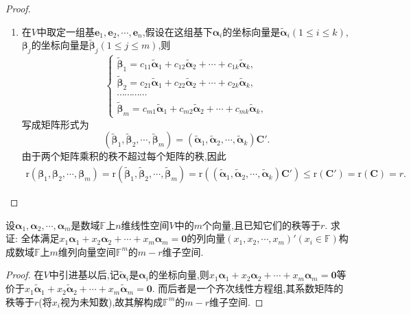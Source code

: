 \documentclass[../../main.tex]{subfiles}
\begin{document}
\begin{proof}
\begin{enumerate}[(1)]
\item 在\(V\)中取定一组基\(\boldsymbol{e}_1,\boldsymbol{e}_2,\cdots,\boldsymbol{e}_n\),假设在这组基下\(\boldsymbol{\alpha}_i\)的坐标向量是\(\widetilde{\boldsymbol{\alpha}}_i(1\leq i\leq k)\),\(\boldsymbol{\beta}_j\)的坐标向量是\(\widetilde{\boldsymbol{\beta}}_j(1\leq j\leq m)\),则
\[
\begin{cases}
\widetilde{\boldsymbol{\beta}}_1 = c_{11}\widetilde{\boldsymbol{\alpha}}_1 + c_{12}\widetilde{\boldsymbol{\alpha}}_2+\cdots + c_{1k}\widetilde{\boldsymbol{\alpha}}_k,\\
\widetilde{\boldsymbol{\beta}}_2 = c_{21}\widetilde{\boldsymbol{\alpha}}_1 + c_{22}\widetilde{\boldsymbol{\alpha}}_2+\cdots + c_{2k}\widetilde{\boldsymbol{\alpha}}_k,\\
\cdots\cdots\cdots\cdots\\
\widetilde{\boldsymbol{\beta}}_m = c_{m1}\widetilde{\boldsymbol{\alpha}}_1 + c_{m2}\widetilde{\boldsymbol{\alpha}}_2+\cdots + c_{mk}\widetilde{\boldsymbol{\alpha}}_k,
\end{cases}
\]
写成矩阵形式为
\[
(\widetilde{\boldsymbol{\beta}}_1,\widetilde{\boldsymbol{\beta}}_2,\cdots,\widetilde{\boldsymbol{\beta}}_m)=(\widetilde{\boldsymbol{\alpha}}_1,\widetilde{\boldsymbol{\alpha}}_2,\cdots,\widetilde{\boldsymbol{\alpha}}_k)\boldsymbol{C}'.
\]
由于两个矩阵乘积的秩不超过每个矩阵的秩,因此
\begin{align*}
\mathrm{r}\left( \boldsymbol{\beta }_1,\boldsymbol{\beta }_2,\cdots ,\boldsymbol{\beta }_m \right) =\mathrm{r}\left( \widetilde{\boldsymbol{\beta }}_1,\widetilde{\boldsymbol{\beta }}_2,\cdots ,\widetilde{\boldsymbol{\beta }}_m \right) =\mathrm{r}\left( \left( \widetilde{\boldsymbol{\alpha }}_1,\widetilde{\boldsymbol{\alpha }}_2,\cdots ,\widetilde{\boldsymbol{\alpha }}_k \right) \boldsymbol{C}' \right) \leqslant \mathrm{r}\left( \boldsymbol{C}'\right) =\mathrm{r}\left( \boldsymbol{C} \right) =r.
\end{align*}
\end{enumerate}
\end{proof}

\begin{proposition}\label{proposition:向量方程的解空间}
设\(\boldsymbol{\alpha}_1,\boldsymbol{\alpha}_2,\cdots,\boldsymbol{\alpha}_m\)是数域\(\mathbb{F}\)上\(n\)维线性空间\(V\)中的\(m\)个向量,且已知它们的秩等于\(r\). 求证: 全体满足\(x_1\boldsymbol{\alpha}_1 + x_2\boldsymbol{\alpha}_2+\cdots + x_m\boldsymbol{\alpha}_m = \boldsymbol{0}\)的列向量\((x_1,x_2,\cdots,x_m)'(x_i\in\mathbb{F})\)构成数域\(\mathbb{F}\)上\(m\)维列向量空间\(\mathbb{F}^m\)的\(m - r\)维子空间.
\end{proposition}
\begin{proof}
在\(V\)中引进基以后,记\(\widetilde{\boldsymbol{\alpha}}_i\)是\(\boldsymbol{\alpha}_i\)的坐标向量,则\(x_1\boldsymbol{\alpha}_1 + x_2\boldsymbol{\alpha}_2+\cdots + x_m\boldsymbol{\alpha}_m = \boldsymbol{0}\)等价于\(x_1\widetilde{\boldsymbol{\alpha}}_1 + x_2\widetilde{\boldsymbol{\alpha}}_2+\cdots + x_m\widetilde{\boldsymbol{\alpha}}_m = \boldsymbol{0}\). 而后者是一个齐次线性方程组,其系数矩阵的秩等于\(r\)(将\(x_i\)视为未知数),故其解构成\(\mathbb{F}^m\)的\(m - r\)维子空间.
\end{proof}
\end{document}
